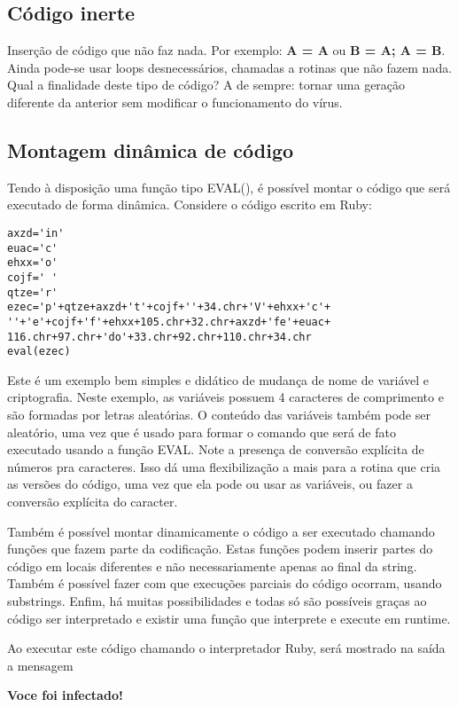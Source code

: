 \subsection{Código inerte}
Inserção de código que não faz nada. Por exemplo: \textbf{A = A} ou \textbf{B = A; A = B}. Ainda pode-se usar loops desnecessários, chamadas a rotinas que não fazem nada. Qual a finalidade deste tipo de código? A de sempre: tornar uma geração diferente da anterior sem modificar o funcionamento do vírus.

\subsection{Montagem dinâmica de código}
Tendo à disposição uma função tipo EVAL(), é possível montar o código que será executado de forma dinâmica. Considere o código escrito em Ruby:


{{{
\renewcommand{\baselinestretch}{1.0}
\begin{verbatim}
axzd='in'
euac='c'
ehxx='o'
cojf=' '
qtze='r'
ezec='p'+qtze+axzd+'t'+cojf+''+34.chr+'V'+ehxx+'c'+
''+'e'+cojf+'f'+ehxx+105.chr+32.chr+axzd+'fe'+euac+
116.chr+97.chr+'do'+33.chr+92.chr+110.chr+34.chr
eval(ezec)
\end{verbatim}
}}}

Este é um exemplo bem simples e didático de mudança de nome de variável e criptografia. Neste exemplo, as variáveis possuem 4 caracteres de comprimento e são formadas por letras aleatórias. O conteúdo das variáveis também pode ser aleatório, uma vez que é usado para formar o comando que será de fato executado usando a função EVAL. Note a presença de conversão explícita de números pra caracteres. Isso dá uma flexibilização a mais para a rotina que cria as versões do código, uma vez que ela pode ou usar as variáveis, ou fazer a conversão explícita do caracter.

Também é possível montar dinamicamente o código a ser executado chamando funções que fazem parte da codificação. Estas funções podem inserir partes do código em locais diferentes e não necessariamente apenas ao final da string. Também é possível fazer com que execuções parciais do código ocorram, usando substrings. Enfim, há muitas possibilidades e todas só são possíveis graças ao código ser interpretado e existir uma função que interprete e execute em runtime.

Ao executar este código chamando o interpretador Ruby, será mostrado na saída a mensagem

\textbf{Voce foi infectado!}